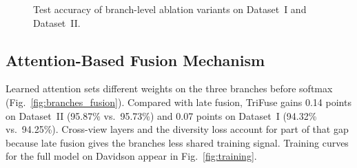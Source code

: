 \begin{table}[!t]
\caption{Branch-Level Ablation Results}
\label{tab:ablation_dual}
\centering
{}
\end{table}

\begin{figure}[!t]
\centering

\caption{Test accuracy of branch-level ablation variants on Dataset~I and Dataset~II.}
\label{fig:ablation}
\end{figure}

\subsection{Attention-Based Fusion Mechanism}

Learned attention sets different weights on the three branches before softmax (Fig.~\ref{fig:branches_fusion}). Compared with late fusion, TriFuse gains 0.14 points on Dataset~II (95.87\% vs.\ 95.73\%) and 0.07 points on Dataset~I (94.32\% vs.\ 94.25\%). Cross-view layers and the diversity loss account for part of that gap because late fusion gives the branches less shared training signal. Training curves for the full model on Davidson appear in Fig.~\ref{fig:training}.

